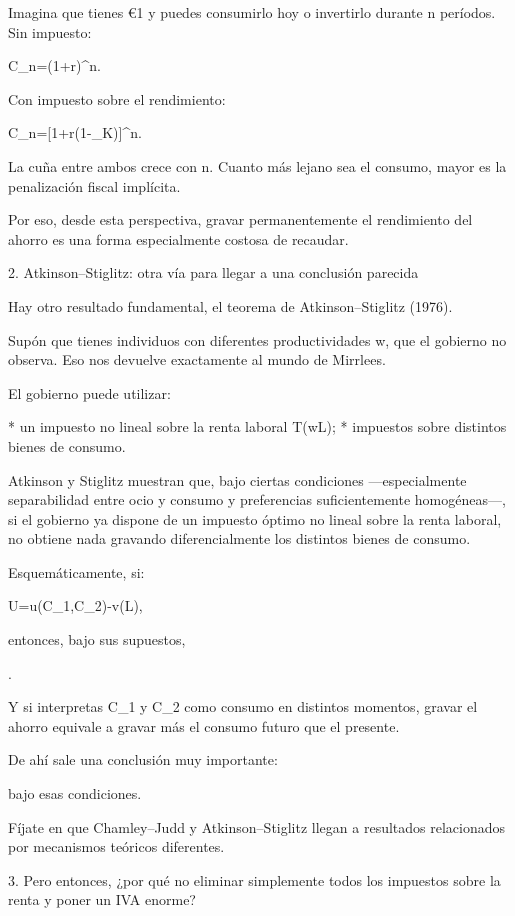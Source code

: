 \documentclass[10pt,a4paper]{article}
\begin{document}
Imagina que tienes €1 y puedes consumirlo hoy o invertirlo durante n períodos. Sin impuesto:

C_n=(1+r)^n.

Con impuesto sobre el rendimiento:

C_n=[1+r(1-\tau_K)]^n.

La cuña entre ambos crece con n. Cuanto más lejano sea el consumo, mayor es la penalización fiscal implícita.

Por eso, desde esta perspectiva, gravar permanentemente el rendimiento del ahorro es una forma especialmente costosa de recaudar.

2. Atkinson–Stiglitz: otra vía para llegar a una conclusión parecida

Hay otro resultado fundamental, el teorema de Atkinson–Stiglitz (1976).

Supón que tienes individuos con diferentes productividades w, que el gobierno no observa. Eso nos devuelve exactamente al mundo de Mirrlees.

El gobierno puede utilizar:

* un impuesto no lineal sobre la renta laboral T(wL);
* impuestos sobre distintos bienes de consumo.

Atkinson y Stiglitz muestran que, bajo ciertas condiciones —especialmente separabilidad entre ocio y consumo y preferencias suficientemente homogéneas—, si el gobierno ya dispone de un impuesto óptimo no lineal sobre la renta laboral, no obtiene nada gravando diferencialmente los distintos bienes de consumo.

Esquemáticamente, si:

U=u(C_1,C_2)-v(L),

entonces, bajo sus supuestos,

.

Y si interpretas C_1 y C_2 como consumo en distintos momentos, gravar el ahorro equivale a gravar más el consumo futuro que el presente.

De ahí sale una conclusión muy importante:


bajo esas condiciones.

Fíjate en que Chamley–Judd y Atkinson–Stiglitz llegan a resultados relacionados por mecanismos teóricos diferentes.

3. Pero entonces, ¿por qué no eliminar simplemente todos los impuestos sobre la renta y poner un IVA enorme?
\end{document}
